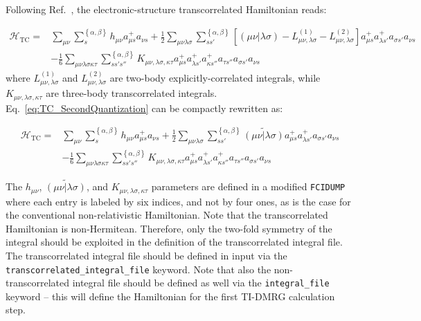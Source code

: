 \documentclass[bibliography=totoc,12pt,a4paper]{scrartcl}
\begin{document}
Following Ref.~, the electronic-structure transcorrelated Hamiltonian reads:

\begin{equation}
 \begin{aligned}
  \mathcal{H}_\text{TC} =& \sum_{\mu \nu} \sum_{s}^{\left\{ \alpha,\beta \right\}}
        h_{\mu \nu} a_{\mu s}^+ a_{\nu s}
      + \frac{1}{2} \sum_{\mu \nu \lambda \sigma} \sum_{s s'}^{\left\{ \alpha,\beta \right\}}
        \left[ ( \mu \nu | \lambda \sigma ) - L_{\mu\nu,\lambda\sigma}^{(1)} - L_{\mu\nu,\lambda\sigma}^{(2)} \right]
        a_{\mu s}^+ a_{\lambda s'}^+ a_{\sigma s'} a_{\nu s} \\
    &- \frac{1}{6} \sum_{\mu \nu \lambda \sigma \kappa \tau} \sum_{s s' s''}^{\left\{ \alpha,\beta \right\}}
       K_{\mu\nu,\lambda\sigma,\kappa\tau} 
       a_{\mu s}^+ a_{\lambda s'}^+ a_{\kappa s''}^+ a_{\tau s''} a_{\sigma s'} a_{\nu s}
 \end{aligned}
 \label{eq:TC_SecondQuantization}
\end{equation}
%
where $L_{\mu\nu,\lambda\sigma}^{(1)}$ and $L_{\mu\nu,\lambda\sigma}^{(2)}$ are two-body explicitly-correlated integrals, while $K_{\mu\nu,\lambda\sigma,\kappa\tau}$ are three-body transcorrelated integrals.
Eq.~\ref{eq:TC_SecondQuantization} can be compactly rewritten as:

\begin{equation}
 \begin{aligned}
  \mathcal{H}_\text{TC} =& \sum_{\mu \nu} \sum_{s}^{\left\{ \alpha,\beta \right\}}
        h_{\mu \nu} a_{\mu s}^+ a_{\nu s}
      + \frac{1}{2} \sum_{\mu \nu \lambda \sigma} \sum_{s s'}^{\left\{ \alpha,\beta \right\}}
        \widetilde{( \mu \nu | \lambda \sigma )} a_{\mu s}^+ a_{\lambda s'}^+ a_{\sigma s'} a_{\nu s} \\
    &- \frac{1}{6} \sum_{\mu \nu \lambda \sigma \kappa \tau} \sum_{s s' s''}^{\left\{ \alpha,\beta \right\}}
       K_{\mu\nu,\lambda\sigma,\kappa\tau} 
       a_{\mu s}^+ a_{\lambda s'}^+ a_{\kappa s''}^+ a_{\tau s''} a_{\sigma s'} a_{\nu s}
 \end{aligned}
 \label{eq:TC_SecondQuantization_2}
\end{equation}

The $h_{\mu \nu}$, $\widetilde{( \mu \nu | \lambda \sigma )}$, and $K_{\mu\nu,\lambda\sigma,\kappa\tau}$ parameters are defined in a modified \texttt{FCIDUMP} where each entry is labeled by six indices, and not by four ones, as is the case for the conventional non-relativistic Hamiltonian.
Note that the transcorrelated Hamiltonian is non-Hermitean.
Therefore, only the two-fold symmetry of the integral should be exploited in the definition of the transcorrelated integral file.
The transcorrelated integral file should be defined in input via the \texttt{transcorrelated\_integral\_file} keyword.
Note that also the non-transcorrelated integral file should be defined as well via the \texttt{integral\_file} keyword -- this will define the Hamiltonian for the first TI-DMRG calculation step.
\end{document}
